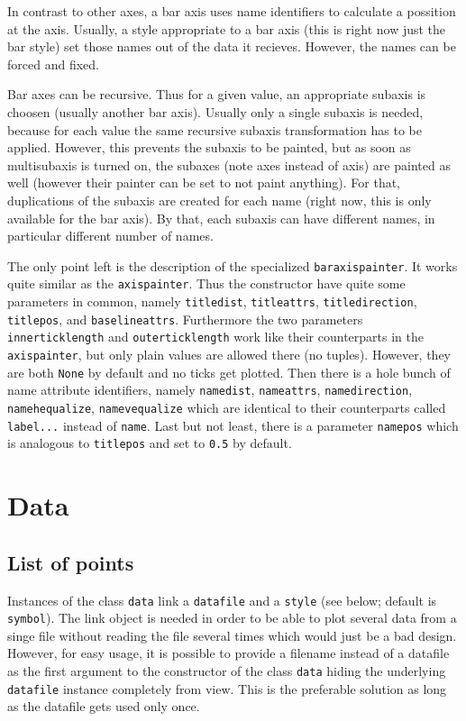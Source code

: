 In contrast to other axes, a bar axis uses name identifiers to
calculate a possition at the axis. Usually, a style appropriate to a
bar axis (this is right now just the bar style) set those names out of
the data it recieves. However, the names can be forced and fixed.

Bar axes can be recursive. Thus for a given value, an appropriate
subaxis is choosen (usually another bar axis). Usually only a single
subaxis is needed, because for each value the same recursive subaxis
transformation has to be applied. However, this prevents the subaxis
to be painted, but as soon as multisubaxis is turned on, the subaxes
(note axes instead of axis) are painted as well (however their painter
can be set to not paint anything). For that, duplications of the
subaxis are created for each name (right now, this is only available
for the bar axis). By that, each subaxis can have different names, in
particular different number of names.

The only point left is the description of the specialized
\verb|baraxispainter|. It works quite similar as the
\verb|axispainter|. Thus the constructor have quite some parameters in
common, namely \verb|titledist|, \verb|titleattrs|,
\verb|titledirection|, \verb|titlepos|, and \verb|baselineattrs|.
Furthermore the two parameters \verb|innerticklength| and
\verb|outerticklength| work like their counterparts in the
\verb|axispainter|, but only plain values are allowed there (no
tuples). However, they are both \verb|None| by default and no ticks
get plotted. Then there is a hole bunch of name
attribute identifiers, namely \verb|namedist|, \verb|nameattrs|,
\verb|namedirection|, \verb|namehequalize|, \verb|namevequalize| which
are identical to their counterparts called \verb|label...| instead of
\verb|name|. Last but not least, there is a parameter \verb|namepos|
which is analogous to \verb|titlepos| and set to \verb|0.5| by
default.

\section{Data}
\label{graph:data}

\subsection{List of points}

Instances of the class \verb|data| link a \verb|datafile| and a
\verb|style| (see below; default is \verb|symbol|). The link object is
needed in order to be able to plot several data from a singe file
without reading the file several times which would just be a bad
design. However, for easy usage, it is possible to provide a filename
instead of a datafile as the first argument to the constructor of the
class \verb|data| hiding the underlying \verb|datafile| instance
completely from view. This is the preferable solution as long as the
datafile gets used only once.

